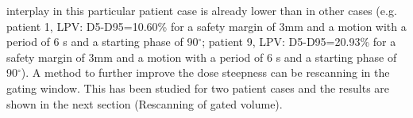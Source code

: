 \documentclass[type=dr, dr=rernat, accentcolor=tud7b,colorbacktitle, bigchapter, openright, twoside, 12pt ]{tudthesis}
\begin{document}
interplay in this particular patient case is already lower than in other cases (e.g. patient 1, LPV: D5-D95=10.60\% for a safety margin of 3mm 
and a motion with a period of 6 s and a starting phase of 90$^{\circ}$; patient 9, LPV: D5-D95=20.93\% for a safety margin of 3mm and a motion 
with a period of 6 s and a starting phase of 90$^{\circ}$).\newline
\newline
A method to further improve the dose steepness can be rescanning in the gating window. This has been studied for two patient cases 
and the results are shown in the next section (Rescanning of gated volume).
\newline



% 




\newpage
\end{document}
